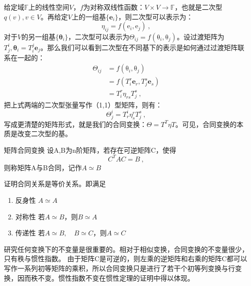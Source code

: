 

\begin{issues}
\issueDraft
\end{issues}

给定域$\mathbb F$上的线性空间$V$，$f$为对称双线性函数：$V\times V\to \mathbb F$，也就是二次型$q(v),v\in V$。再给定$V$上的一组基$\{\boldsymbol e_i\}$，则二次型可以表示为：
\begin{equation}
\eta_{ij}=f(\boldsymbol {\mathrm e}_i,\boldsymbol {\mathrm e}_j)~,
\end{equation}
对于$V$的另一组基$\{\boldsymbol \theta_i\}$，二次型可以表示为$\Theta_{ij}=f(\boldsymbol {\mathrm \theta}_{i},\boldsymbol {\mathrm \theta}_{j})$。设过渡矩阵为$T^i_j,\boldsymbol {\theta}_i=T^j_i\boldsymbol e_j$。那么我们可以看到二次型在不同基下的表示是如何通过过渡矩阵联系在一起的：
\begin{equation}
\begin{aligned}
\Theta_{ij}&=f(\boldsymbol {\mathrm \theta}_{i},\boldsymbol {\mathrm \theta}_{j})\\
&=f(T^r_i\boldsymbol e_r,T^s_j\boldsymbol e_s)\\
&=T^r_i \eta_{rs}T^s_j~,
\end{aligned}
\end{equation}
把上式两端的二次型张量写作（1,1）型矩阵，则有：
$$\Theta^i_j=T^i_r\eta^r_sT^s_j~,$$
写成更清楚的矩阵形式，就是我们的合同变换：$\Theta=T^T\eta T$。可见，合同变换的本质是改变二次型的基。
\begin{definition}{矩阵合同变换}
设A,B为n阶矩阵，若存在可逆矩阵C，使得
\begin{equation}
C^TAC=B~,
\end{equation}
则称矩阵A与B合同，记作$A\simeq B$
\end{definition}
\begin{exercise}{}
证明合同关系是等价关系。即满足
\begin{enumerate}
\item 反身性  $A\simeq A$
\item 对称性  若$A\simeq B$，则$B\simeq A$
\item 传递性  若$A\simeq B,\quad B\simeq C$，则$A\simeq C$
\end{enumerate}
\end{exercise}
研究任何变换下的不变量是很重要的。相对于相似变换，合同变换的不变量很少，只有秩与惯性指数。
由于矩阵C是可逆的，则左乘的逆矩阵和右乘的矩阵C都可以写作一系列初等矩阵的乘积，所以合同变换只是进行了若干个初等列变换与行变换，因而秩不变。惯性指数不变在惯性定理的证明中得以体现。

